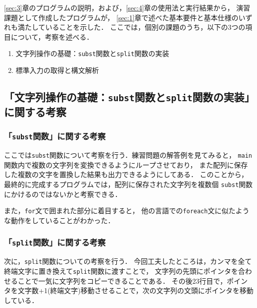 \ref{sec:3}章のプログラムの説明，および，\ref{sec:4}章の使用法と実行結果から，
演習課題として作成したプログラムが，
\ref{sec:1}章で述べた基本要件と基本仕様のいずれも満たしていることを示した．
ここでは，個別の課題のうち，以下の3つの項目について，考察を述べる．

\begin{enumerate}
\setlength{\parskip}{2pt} \setlength{\itemsep}{2pt}
    \item 文字列操作の基礎：\texttt{subst}関数と\texttt{split}関数の実装
    \item 標準入力の取得と構文解析
\end{enumerate}

\subsection{「文字列操作の基礎：\texttt{subst}関数と\texttt{split}関数の実装」に関する考察}

\subsubsection{「\texttt{subst}関数」に関する考察}

ここでは\verb|subst|関数について考察を行う．練習問題の解答例を見てみると，
\verb|main|関数内で複数の文字列を変換できるようにループさせており，
また配列に保存した複数の文字を置換した結果も出力できるようにしてある．
このことから，最終的に完成するプログラムでは，配列に保存された文字列を複数個
\verb|subst|関数にかけるのではないかと考察できる．

また，\verb|for|文で囲まれた部分に着目すると，
他の言語での\verb|foreach|文に似たような動作をしていることがわかった．

\subsubsection{「\texttt{split}関数」に関する考察}

次に，\verb|split|関数についての考察を行う．
今回工夫したところは，カンマを全て終端文字に置き換えて\verb|split|関数に渡すことで，
文字列の先頭にポインタを合わせることで一気に文字列をコピーできることである．
その後23行目で，ポインタを文字数+1(終端文字)移動させることで，次の文字列の文頭にポインタを移動している．

